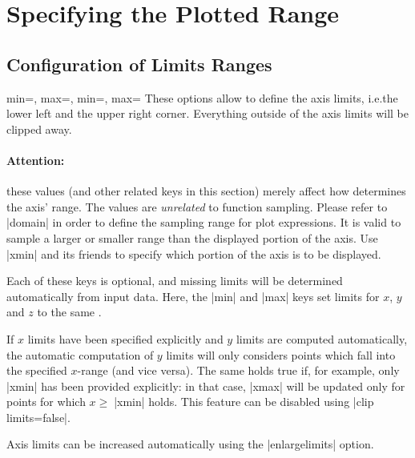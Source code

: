 
\section{Specifying the Plotted Range}

\subsection{Configuration of Limits Ranges}

\begin{pgfplotsxykeylist}{%
    \x min=,
    \x max=,
    min=,
    max=%
}
\label{page:access:limits}
    These options allow to define the axis limits, i.e.\@ the lower left and
    the upper right corner. Everything outside of the axis limits will be
    clipped away.


    \paragraph{Attention:}

    these values (and other related keys in this section) merely affect how
    \PGFPlots{} determines the axis' range. The values are \emph{unrelated} to
    function sampling. Please refer to |domain| in order to define the sampling
    range for plot expressions. It is valid to sample a larger or smaller range
    than the displayed portion of the axis. Use |xmin| and its friends to
    specify which portion of the axis is to be displayed.

    Each of these keys is optional, and missing limits will be determined
    automatically from input data. Here, the |min| and |max| keys set limits
    for $x$, $y$ and $z$ to the same .

    If $x$ limits have been specified explicitly and $y$ limits are computed
    automatically, the automatic computation of $y$ limits will only considers
    points which fall into the specified $x$-range (and vice versa). The same
    holds true if, for example, only |xmin| has been provided explicitly: in
    that case, |xmax| will be updated only for points for which $x \ge
    \;$|xmin| holds. This feature can be disabled using |clip limits=false|.

    Axis limits can be increased automatically using the |enlargelimits|
    option.
\begin{codeexample}[]
\end{codeexample}


\end{pgfplotsxykeylist}
